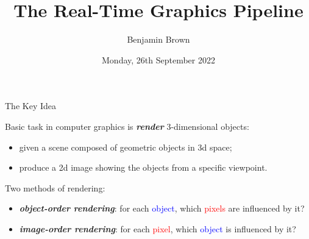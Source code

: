 \documentclass{beamer}
\title[Graphics Pipeline]{The Real-Time Graphics Pipeline}
\author{Benjamin Brown}
\date{Monday, 26th September 2022}
\newcommand{\emphbf}[1]{\textbf{\emph{#1}}}
\begin{document}
\begin{frame}
  \titlepage
\end{frame}


\begin{frame}{The Key Idea}

Basic task in computer graphics is \emphbf{render} 3-dimensional objects:

\begin{itemize}
  \item given a scene composed of geometric objects in 3d space;
  \item produce a 2d image showing the objects from a specific viewpoint.
\end{itemize}

\vskip 1cm

Two methods of rendering:

\begin{itemize}
	\item \emphbf{object-order rendering}: for each \textcolor{blue}{object}, which \textcolor{red}{pixels} are influenced by it?
	\item \emphbf{image-order rendering}: for each \textcolor{red}{pixel}, which \textcolor{blue}{object} is influenced by it?
\end{itemize}

\end{frame}
\end{document}

